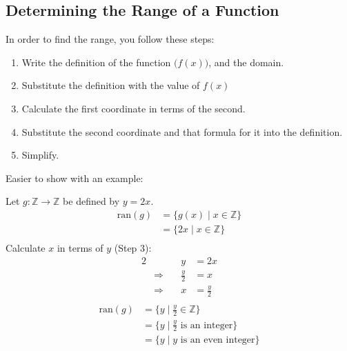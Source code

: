 \documentclass[\main/notes.tex]{subfiles}
\begin{document}
			\subsection{Determining the Range of a Function}
				In order to find the range, you follow these steps:
				\begin{enumerate}
					\item Write the definition of the function $\bigl(f(x)\bigr)$, and the domain.
					\item Substitute the definition with the value of $f(x)$
					\item Calculate the first coordinate in terms of the second.
					\item Substitute the second coordinate and that formula for it into the definition.
					\item Simplify.
				\end{enumerate}
				\pagebreak
				Easier to show with an example:
				\begin{example}[width=0.8\textwidth]
					Let $g: \mathbb{Z} \rightarrow \mathbb{Z}$ be defined by $y = 2x$.
					\begin{align*}
						\mathrm{ran}(g) &= \{g(x) \mid x \in \mathbb{Z}\}\tag*{$(1)$}\\
						&= \{2x \mid x \in \mathbb{Z}\}\tag*{$(2)$}\\
					\end{align*}
					Calculate $x$ in terms of $y$ (Step $3$):
					\begin{alignat*}{2}
						& \qquad &y &= 2x\\
						& \Rightarrow \quad &\frac{y}{2} &= x\\
						& \Rightarrow \quad &x &= \frac{y}{2}\\
					\end{alignat*}
					\begin{align*}
						\mathrm{ran}(g) &= \{y \mid \frac{y}{2} \in \mathbb{Z}\}\tag*{$(4)$}\\
						&= \{y \mid \frac{y}{2} \text{ is an integer}\}\tag*{$(5)$}\\
						&= \{y \mid y \text{ is an even integer}\}
					\end{align*}
				\end{example}
\end{document}
